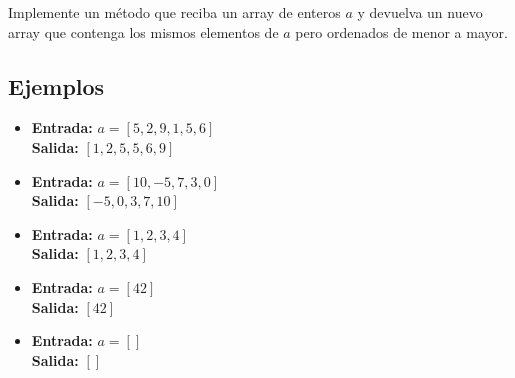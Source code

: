 Implemente un método que reciba un array de enteros \(a\) y devuelva un nuevo array que contenga los mismos elementos de \(a\) pero ordenados de menor a mayor.

\subsection*{Ejemplos}

\begin{itemize}
    \item \textbf{Entrada:} \(a = [5, 2, 9, 1, 5, 6]\)\\
    \textbf{Salida:} \([1, 2, 5, 5, 6, 9]\)\\

    \item \textbf{Entrada:} \(a = [10, -5, 7, 3, 0]\)\\
    \textbf{Salida:} \([-5, 0, 3, 7, 10]\)\\

    \item \textbf{Entrada:} \(a = [1, 2, 3, 4]\)\\
    \textbf{Salida:} \([1, 2, 3, 4]\)\\

    \item \textbf{Entrada:} \(a = [42]\)\\
    \textbf{Salida:} \([42]\)\\

    \item \textbf{Entrada:} \(a = []\)\\
    \textbf{Salida:} \([]\)\\
\end{itemize}
